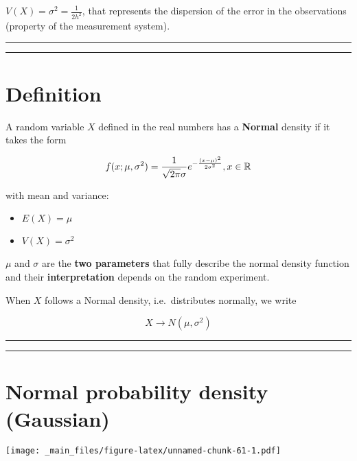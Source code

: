 \documentclass[
]{book}
\providecommand{\tightlist}{%
  \setlength{\itemsep}{0pt}\setlength{\parskip}{0pt}}
\begin{document}
\(V(X)=\sigma^2=\frac{1}{2h^2}\), that represents the dispersion of the error in the observations (property of the measurement system).

\begin{center}\rule{0.5\linewidth}{0.5pt}\end{center}

\begin{center}\rule{0.5\linewidth}{0.5pt}\end{center}

\hypertarget{definition}{%
\section{Definition}\label{definition}}

A random variable \(X\) defined in the real numbers has a \textbf{Normal} density if it takes the form

\[f(x; \mu, \sigma^2)=\frac{1}{\sqrt{2\pi}\sigma}e^{-\frac{(x-\mu)^2}{2\sigma^2}}, x \in {\Bbb R}\]

with mean and variance:

\begin{itemize}
\tightlist
\item
  \(E (X) = \mu\)
\item
  \(V (X) = \sigma^2\)
\end{itemize}

\(\mu\) and \(\sigma\) are the \textbf{two parameters} that fully describe the normal density function and their \textbf{interpretation} depends on the random experiment.

When \(X\) follows a Normal density, i.e.~distributes normally, we write

\[X\rightarrow N(\mu,\sigma^2)\]

\begin{center}\rule{0.5\linewidth}{0.5pt}\end{center}

\begin{center}\rule{0.5\linewidth}{0.5pt}\end{center}

\hypertarget{normal-probability-density-gaussian}{%
\section{Normal probability density (Gaussian)}\label{normal-probability-density-gaussian}}

\texttt{[image: \_main\_files/figure-latex/unnamed-chunk-61-1.pdf]}
\end{document}
